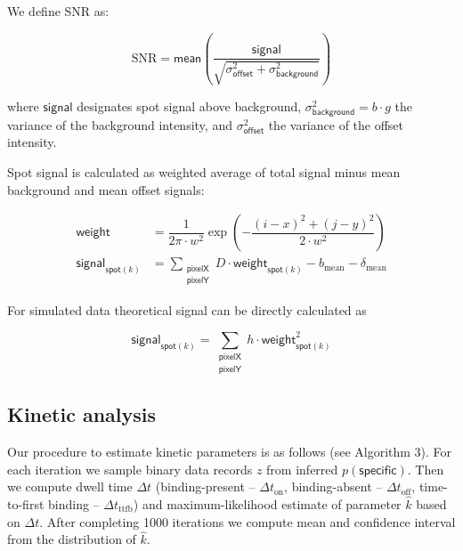 We define SNR as:

\begin{equation}
    \mathrm{SNR} = \mathsf{mean} \left( \dfrac{\mathsf{signal}}{\sqrt{\sigma^2_{\mathsf{offset}} + \sigma^2_{\mathsf{background}}}} \right)
\end{equation}

where $\mathsf{signal}$ designates spot signal above background, $\sigma^2_{\mathsf{background}} = b \cdot g$ the variance of the background intensity, and $\sigma^2_{\mathsf{offset}}$ the variance of the offset intensity.

Spot signal is calculated as weighted average of total signal minus mean background and mean offset signals:

\begin{subequations}
\begin{align}
    \mathsf{weight} &= \dfrac{1}{2 \pi \cdot w^2} \exp{\left( -\dfrac{(i-x)^2 + (j-y)^2}{2 \cdot w^2} \right)} \\
    \mathsf{signal}_{\mathsf{spot}(k)} &=  \sum_{\substack{\mathsf{pixelX} \\ \mathsf{pixelY}}} D \cdot \mathsf{weight}_{\mathsf{spot}(k)} - b_{\mathrm{mean}} - \delta_\mathrm{mean}
\end{align}
\end{subequations}

For simulated data theoretical signal can be directly calculated as

\begin{equation}
    \mathsf{signal}_{\mathsf{spot}(k)} =  \sum_{\substack{\mathsf{pixelX} \\ \mathsf{pixelY}}} h \cdot \mathsf{weight}_{\mathsf{spot}(k)}^2
\end{equation}

\subsection*{Kinetic analysis}

Our procedure to estimate kinetic parameters is as follows (see Algorithm 3). For each iteration we sample binary data records $z$ from inferred $p(\mathsf{specific})$. Then we compute dwell time $\Delta t$ (binding-present -- $\Delta t_\mathrm{on}$, binding-absent -- $\Delta t_\mathrm{off}$, time-to-first binding -- $\Delta t_\mathrm{ttfb}$) and maximum-likelihood estimate of parameter $\hat{k}$ based on $\Delta t$. After completing 1000 iterations we compute mean and confidence interval from the distribution of $\hat{k}$.

